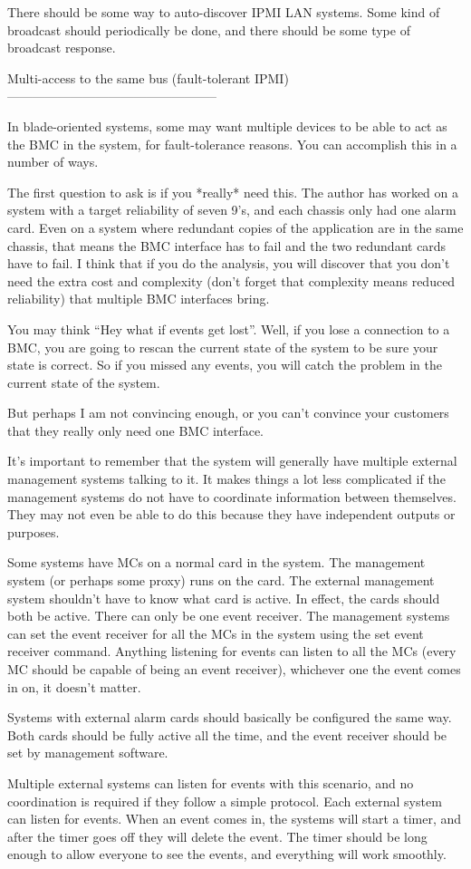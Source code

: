 There should be some way to auto-discover IPMI LAN systems.  Some kind
of broadcast should periodically be done, and there should be some
type of broadcast response.


Multi-access to the same bus (fault-tolerant IPMI)
--------------------------------------------------

In blade-oriented systems, some may want multiple devices to be able
to act as the BMC in the system, for fault-tolerance reasons.  You can
accomplish this in a number of ways.

The first question to ask is if you *really* need this.  The author
has worked on a system with a target reliability of seven 9's, and
each chassis only had one alarm card.  Even on a system where
redundant copies of the application are in the same chassis, that
means the BMC interface has to fail and the two redundant cards have
to fail.  I think that if you do the analysis, you will discover that
you don't need the extra cost and complexity (don't forget that
complexity means reduced reliability) that multiple BMC interfaces
bring.

You may think ``Hey what if events get lost''.  Well, if you lose a
connection to a BMC, you are going to rescan the current state of the
system to be sure your state is correct.  So if you missed any events,
you will catch the problem in the current state of the system.

But perhaps I am not convincing enough, or you can't convince your
customers that they really only need one BMC interface.

It's important to remember that the system will generally have
multiple external management systems talking to it.  It makes things a
lot less complicated if the management systems do not have to
coordinate information between themselves.  They may not even be able
to do this because they have independent outputs or purposes.

Some systems have MCs on a normal card in the system.  The management
system (or perhaps some proxy) runs on the card.  The external
management system shouldn't have to know what card is active.  In
effect, the cards should both be active.  There can only be one event
receiver.  The management systems can set the event receiver for all
the MCs in the system using the set event receiver command.  Anything
listening for events can listen to all the MCs (every MC should be
capable of being an event receiver), whichever one the event comes in
on, it doesn't matter.

Systems with external alarm cards should basically be configured the
same way.  Both cards should be fully active all the time, and the
event receiver should be set by management software.

Multiple external systems can listen for events with this scenario,
and no coordination is required if they follow a simple protocol.
Each external system can listen for events.  When an event comes in,
the systems will start a timer, and after the timer goes off they will
delete the event.  The timer should be long enough to allow everyone
to see the events, and everything will work smoothly.
